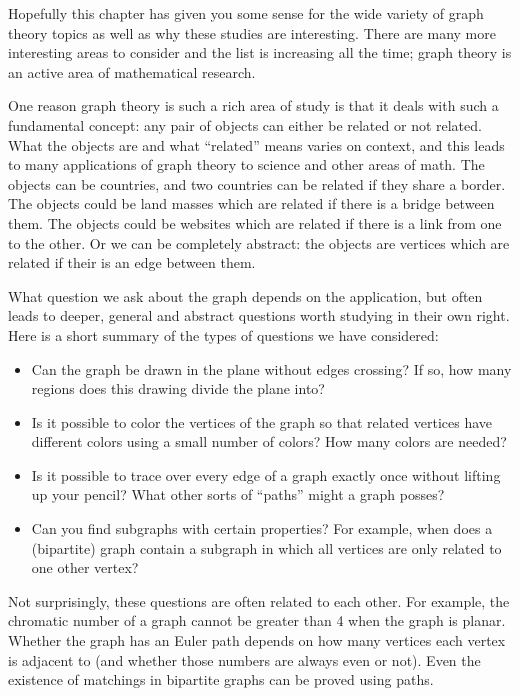 \documentclass[10pt,]{book}
\theoremstyle{plain}
\theoremstyle{definition}
\theoremstyle{definition}
\theoremstyle{definition}
\numberwithin{equation}{chapter}
\begin{document}
      Hopefully this chapter has given you some sense for the wide variety of graph theory topics as well as why these studies are interesting. There are many more interesting areas to consider and the list is increasing all the time; graph theory is an active area of mathematical research.
\par

      One reason graph theory is such a rich area of study is that it deals with such a fundamental concept: any pair of objects can either be related or not related. What the objects are and what ``related'' means varies on context, and this leads to many applications of graph theory to science and other areas of math. The objects can be countries, and two countries can be related if they share a border. The objects could be land masses which are related if there is a bridge between them. The objects could be websites which are related if there is a link from one to the other. Or we can be completely abstract: the objects are vertices which are related if their is an edge between them.
\par

      What question we ask about the graph depends on the application, but often leads to deeper, general and abstract questions worth studying in their own right. Here is a short summary of the types of questions we have considered:
\leavevmode%
\begin{itemize}[label=\textbullet]
\item{}
          Can the graph be drawn in the plane without edges crossing? If so, how many regions does this drawing divide the plane into?
\item{}
          Is it possible to color the vertices of the graph so that related vertices have different colors using a small number of colors? How many colors are needed?
\item{}
          Is it possible to trace over every edge of a graph exactly once without lifting up your pencil? What other sorts of ``paths'' might a graph posses?
\item{}
          Can you find subgraphs with certain properties? For example, when does a (bipartite) graph contain a subgraph in which all vertices are only related to one other vertex?
\end{itemize}
\par

      Not surprisingly, these questions are often related to each other. For example, the chromatic number of a graph cannot be greater than 4 when the graph is planar. Whether the graph has an Euler path depends on how many vertices each vertex is adjacent to (and whether those numbers are always even or not). Even the existence of matchings in bipartite graphs can be proved using paths.
\typeout{************************************************}
\typeout{************************************************}
\end{document}
